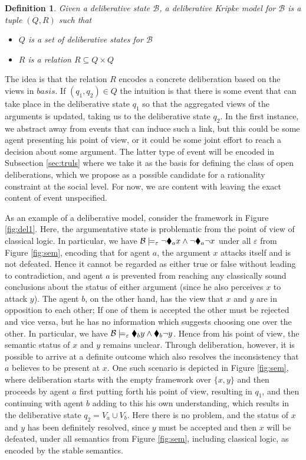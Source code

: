 \documentclass{article}
\newtheorem{definition}[thm]{Definition}
\newcommand{\basis}{basis }
\newcommand{\views}{\mathcal B}
\newcommand{\sem}{\varepsilon}
\begin{document}
\begin{definition}\label{def:dk}
Given a deliberative state $\views$, a deliberative Kripke model for $\views$ is a tuple $(Q,R)$ such that
\begin{itemize}
\item $Q$ is a set of deliberative states for $\views$
\item $R$ is a relation $R \subseteq Q \times Q$
\end{itemize}
\end{definition}

The idea is that the relation $R$ encodes a concrete deliberation based on the views in $\basis$. If $(q_1,q_2) \in Q$ the intuition is that there is some event that can take place in the deliberative state $q_1$ so that the aggregated views of the arguments is updated, taking us to the deliberative state $q_2$. In the first instance, we abstract away from events that can induce such a link, but this could be some agent presenting his point of view, or it could be some joint effort to reach a decision about some argument. The latter type of event will be encoded in Subsection \ref{sec:truls} where we take it as the basis for defining the class of open deliberations, which we propose as a possible candidate for a rationality constraint at the social level. For now, we are content with leaving the exact content of event unspecified. 

As an example of a deliberative model, consider the framework in Figure \ref{fig:del1}. Here, the argumentative state is problematic from the point of view of classical logic. In particular, we have $\views \models_\sem \neg \cdia_a x \land \neg \cdia_a \neg x$ under all $\sem$ from Figure \ref{fig:sem}, encoding that for agent $a$, the argument $x$ attacks itself and is not defeated. Hence it cannot be regarded as either true or false without leading to contradiction, and agent $a$ is prevented from reaching any classically sound conclusions about the status of either argument (since he also perceives $x$ to attack $y$). The agent $b$, on the other hand, has the view that $x$ and $y$ are in opposition to each other; If one of them is accepted the other must be rejected and vice versa, but he has no information which suggests choosing one over the other. In particular, we have $\views \models_\sem \cdia_b y \land \cdia_b \neg y$. Hence from his point of view, the semantic status of $x$ and $y$ remains unclear. Through deliberation, however, it is possible to arrive at a definite outcome which also resolves the inconsistency that $a$ believes to be present at $x$. One such scenario is depicted in Figure \ref{fig:sem}, where deliberation starts with the empty framework over $\{x,y\}$ and then proceeds by agent $a$ first putting forth his point of view, resulting in $q_1$, and then continuing with agent $b$ adding to this his own understanding, which results in the deliberative state $q_2 = V_a \cup V_b$. Here there is no problem, and the status of $x$ and $y$ has been definitely resolved, since $y$ must be accepted and then $x$ will be defeated, under all semantics from Figure \ref{fig:sem}, including classical logic, as encoded by the stable semantics.
\end{document}
